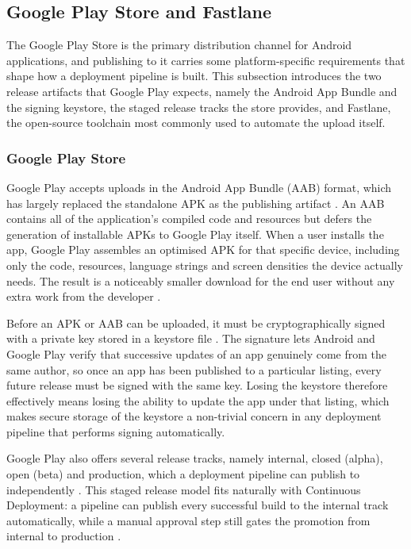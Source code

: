 \subsection{Google Play Store and Fastlane}
The Google Play Store is the primary distribution channel for Android applications, and publishing to it carries some platform-specific requirements that shape how a deployment pipeline is built. This subsection introduces the two release artifacts that Google Play expects, namely the Android App Bundle and the signing keystore, the staged release tracks the store provides, and Fastlane, the open-source toolchain most commonly used to automate the upload itself.

\subsubsection{Google Play Store}
Google Play accepts uploads in the Android App Bundle (AAB) format, which has largely replaced the standalone APK as the publishing artifact \cite{b9}. An AAB contains all of the application's compiled code and resources but defers the generation of installable APKs to Google Play itself. When a user installs the app, Google Play assembles an optimised APK for that specific device, including only the code, resources, language strings and screen densities the device actually needs. The result is a noticeably smaller download for the end user without any extra work from the developer \cite{b9}.

Before an APK or AAB can be uploaded, it must be cryptographically signed with a private key stored in a keystore file \cite{b10}. The signature lets Android and Google Play verify that successive updates of an app genuinely come from the same author, so once an app has been published to a particular listing, every future release must be signed with the same key. Losing the keystore therefore effectively means losing the ability to update the app under that listing, which makes secure storage of the keystore a non-trivial concern in any deployment pipeline that performs signing automatically.

Google Play also offers several release tracks, namely internal, closed (alpha), open (beta) and production, which a deployment pipeline can publish to independently \cite{b11}. This staged release model fits naturally with Continuous Deployment: a pipeline can publish every successful build to the internal track automatically, while a manual approval step still gates the promotion from internal to production \cite{b7}.

